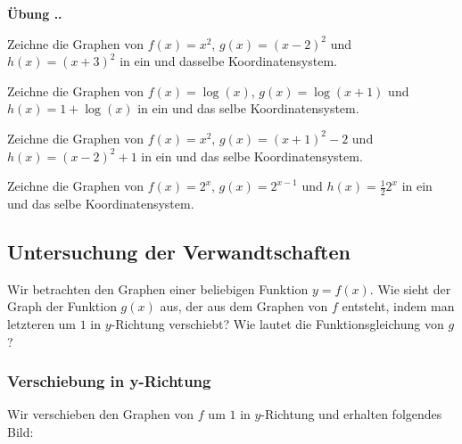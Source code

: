 \documentclass[%
11pt,%
twoside,%
titlepage,%
german,%
headsepline%
]{scrartcl}
\newcommand{\faEyeLightGray}{\textcolor{lightgray}{\faEye}} %
\newcommand{\concatueb}[1]{ueb:#1}%
\newcommand{\concatlsg}[1]{lsg:#1}%
\newcounter{uebcounter}[section]
\renewcommand{\theuebcounter}{\thesection.\arabic{uebcounter}}  %
\newenvironment{uebenv}[1]{%
    \refstepcounter{uebcounter}
    \par\noindent\textbf{Übung \theuebcounter.}%
    \label{\concatueb{#1}}\hfill\hyperref[\concatlsg{#1}]{\faEyeLightGray}\par
}{%
    \par
}
\begin{document}
\begin{uebenv}{shiftgraphs}
    Zeichne die Graphen von $f(x)=x^2$, $g(x)=(x-2)^2$ und $h(x)=(x+3)^2$ in ein und dasselbe Koordinatensystem.

    Zeichne die Graphen von $f(x)=\log(x)$, $g(x)=\log(x+1)$ und $h(x)=1+\log(x)$ in ein und das selbe Koordinatensystem.

    Zeichne die Graphen von $f(x)=x^2$, $g(x)=(x+1)^2-2$ und $h(x)=(x-2)^2+1$ in ein und das selbe Koordinatensystem.

    Zeichne die Graphen von $f(x)=2^x$, $g(x)=2^{x-1}$ und $h(x)=\frac{1}{2}2^x$ in ein und das selbe Koordinatensystem.
\end{uebenv}



\subsection{Untersuchung der Verwandtschaften}
  \begin{bsp}
  Wir betrachten den Graphen einer beliebigen Funktion $y=f(x)$. Wie sieht der Graph der Funktion $g(x)$ aus, der aus dem Graphen von $f$ entsteht, indem man letzteren um $1$ in $y$-Richtung verschiebt? Wie lautet die Funktionsgleichung von $g$?\\[-1ex]

\begin{center}
\end{center}
\end{bsp}

\subsubsection{Verschiebung in y-Richtung}
Wir verschieben den Graphen von $f$ um $1$ in $y$-Richtung und erhalten folgendes Bild:\\
\end{document}
